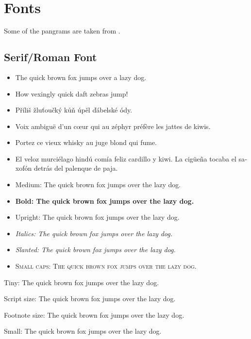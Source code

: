 \chapter{Fonts}

Some of the pangrams are taken from \autocite{rut2014}.

\section{Serif/Roman Font}
\rmfamily
\blindtext
\begin{itemize}
    \item The quick brown fox jumps over a lazy dog.
    \item How vexingly quick daft zebras jump!
    \item \foreignlanguage{czech}{Příliš žluťoučký kůň úpěl ďábelské ódy.}
    \item \foreignlanguage{french}{Voix ambiguë d'un cœur qui au zéphyr préfère les jattes de kiwis.}
    \item \foreignlanguage{french}{Portez ce vieux whisky au juge blond qui fume.}
    \item \foreignlanguage{spanish}{El veloz murciélago hindú comía feliz cardillo y kiwi. La cigüeña tocaba el saxofón detrás del palenque de paja.}
\end{itemize}
\begin{itemize}
    \item \textmd{Medium: The quick brown fox jumps over the lazy dog.}
    \item \textbf{Bold: The quick brown fox jumps over the lazy dog.}
    \item \textup{Upright: The quick brown fox jumps over the lazy dog.}
    \item \textit{Italics: The quick brown fox jumps over the lazy dog.}
    \item \textsl{Slanted: The quick brown fox jumps over the lazy dog.}
    \item \textsc{Small caps: The quick brown fox jumps over the lazy dog.}
\end{itemize}

{\tiny Tiny: The quick brown fox jumps over the lazy dog.}

{\scriptsize Script size: The quick brown fox jumps over the lazy dog.}

{\footnotesize Footnote size: The quick brown fox jumps over the lazy dog.}

{\small Small: The quick brown fox jumps over the lazy dog.}


